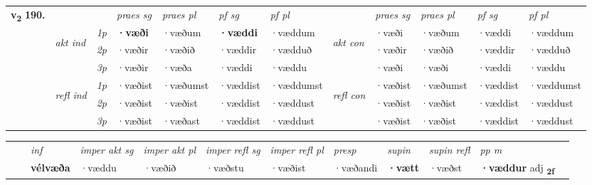 \begin{tabular}{llllllllllll} \toprule
\multirow{4}{*}{{{\textbf{v{\textsubscript{2}}} \Large{\textbf{190.}}}}}  & &   &  \textit{praes sg}  & \textit{praes pl}  &\textit{ pf sg} & \textit{pf pl} &  &  \textit{praes sg}  & \textit{praes pl}  & \textit{pf sg} & \textit{pf pl } \\*
	\cmidrule{4-7} \cmidrule{9-12}
 & \multirow{3}{*}{\begin{turn}{90}\textit{akt ind}\end{turn}} & {\textit{1p}} & \textbf{·væði} & ·væðum    & \textbf{·væddi} & ·væddum & \multirow{3}{*}{\begin{turn}{90}\textit{akt con}\end{turn}} &·væði & ·væðum & ·væddi & ·væddum\\*
& &  {\textit{2p}} &  ·væðir  & ·væðið   & ·væddir & ·vædduð & & ·væðir & ·væðið & ·væddir & ·vædduð \\*
& &  {\textit{3p}} & ·væðir & ·væða   & ·væddi & ·væddu & & ·væði & ·væði& ·væddi & ·væddu  \\*
\cmidrule{4-7} \cmidrule{9-12}
 &\multirow{3}{*}{\begin{turn}{90}\textit{refl ind}\end{turn}} & {\textit{1p}} & ·væðist & ·væðumst    & ·væddist & ·væddumst & \multirow{3}{*}{\begin{turn}{90}\textit{refl con}\end{turn}}  &·væðist & ·væðumst & ·væddist & ·væddumst\\*
 &&  {\textit{2p}} &  ·væðist  & ·væðist   & ·væddist & ·væddust & &·væðist & ·væðist & ·væddist & ·væddust \\*
& &  {\textit{3p}} & ·væðist & ·væðast   & ·væddist & ·væddust & & ·væðist & ·væðist& ·væddist & ·væddust  \\*
\cmidrule{4-7} \cmidrule{9-12}
\end{tabular}


\begin{tabular}{llllllllllll}
 & & \textit{inf} & \textit{imper akt sg} & \textit{imper akt pl} & \textit{imper refl sg} & \textit{imper refl pl} & \textit{presp} & \textit{supin} & \textit{supin refl} & \textit{pp m}     \\*
  & & \textbf{vélvæða} & ·væddu  & ·væðið & ·væðstu & ·væðist & ·væðandi &  \textbf{·vætt} & ·væðst & \textbf{·væddur} adj \textbf{\textsubscript{2f}} \\*
\cmidrule{1-12}
\end{tabular}



